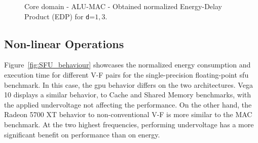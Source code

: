 
\begin{figure}[!htb]
    \centering
    \begin{subfigmatrix}{2}
      \label{fig:MAC_EDP}
    \end{subfigmatrix}
    \caption{Core domain - ALU-MAC - Obtained normalized Energy-Delay Product (EDP) for \texttt{d}=${1,3}$.}
\end{figure}

\subsection{Non-linear Operations}

Figure~\ref{fig:SFU_behaviour} showcases the normalized energy consumption and execution time for different V-F pairs for the single-precision floating-point \acrshort{sfu} benchmark. In this case, the \acrshort{gpu} behavior differs on the two architectures. Vega 10 displays a similar behavior, to Cache and Shared Memory benchmarks, with the applied undervoltage not affecting the  performance. On the other hand, the Radeon 5700 XT behavior to non-conventional V-F is more similar to the MAC benchmark. At the two highest frequencies, performing undervoltage has a more significant benefit on performance than on energy.

